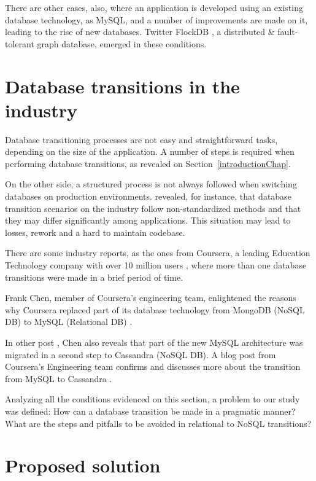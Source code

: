 There are other cases, also, where an application is developed using an existing database technology, as MySQL, and a number of improvements are made on it, leading to the rise of new databases. Twitter FlockDB \cite{flockdb}, a distributed \& fault-tolerant graph database, emerged in these conditions. 


\section{Database transitions in the industry}

Database transitioning processes are not easy and straightforward tasks, depending on the size of the application. A number of steps is required when performing database transitions, as revealed on Section~\ref{introductionChap}.

On the other side, a structured process is not always followed when switching databases on production environments. \cite{fabioMartinSM} revealed, for instance, that database transition scenarios on the industry follow non-standardized methods and that they may differ significantly among applications. This situation may lead to losses, rework and a hard to maintain codebase.

There are some industry reports, as the ones from Coursera, a leading Education Technology company with over 10 million users \cite{courserawiki}, where more than one database transitions were made in a brief period of time.  

Frank Chen, member of Coursera's engineering team, enlightened the reasons why Coursera replaced part of its database technology from MongoDB (NoSQL DB) to MySQL (Relational DB) \cite{coursera-mongodb-mysql} . 

In other post \cite{coursera-mongodb-mysql2}, Chen also reveals that part of the new MySQL architecture was migrated in a second step to Cassandra (NoSQL DB). A blog post from Coursera's Engineering team confirms and discusses more about the transition from MySQL to Cassandra \cite{coursera-mysql-cassandra}. 

Analyzing all the conditions evidenced on this section, a problem to our study was defined: How can a database transition be made in a pragmatic manner? What are the steps and pitfalls to be avoided in relational to NoSQL transitions? 

\section{Proposed solution}

